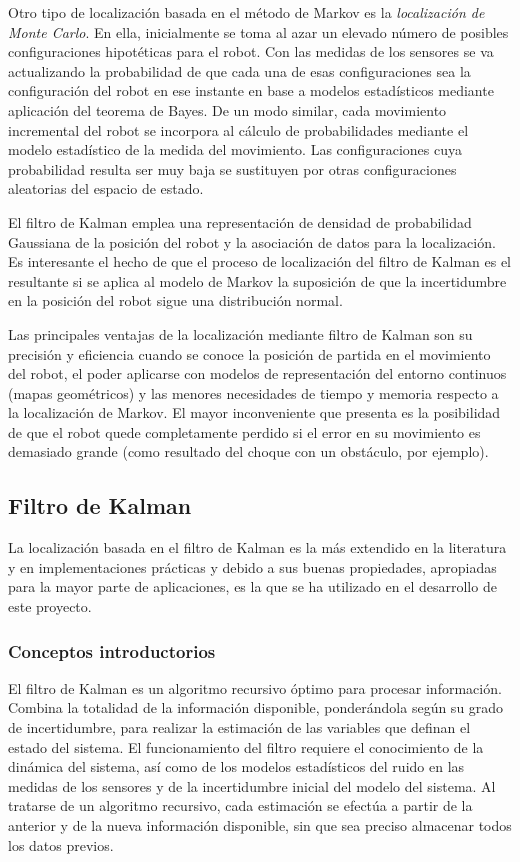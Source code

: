 Otro tipo de localización basada en el método de Markov es la \emph{ localización de Monte Carlo}. En ella, inicialmente se toma al azar  un elevado número de posibles configuraciones hipotéticas para el robot. Con las medidas de los sensores se va actualizando la probabilidad de que cada una de esas configuraciones sea la configuración del robot en ese instante en base a modelos estadísticos mediante aplicación del teorema de Bayes. De un modo similar, cada movimiento incremental del robot se incorpora al cálculo de probabilidades mediante el modelo estadístico de la medida del movimiento. Las configuraciones cuya probabilidad resulta ser muy baja se sustituyen por otras configuraciones aleatorias del espacio de estado.

El filtro de Kalman emplea una representación de densidad de probabilidad Gaussiana de la posición del robot y la asociación de datos para la localización. Es interesante el hecho de que el proceso de localización del filtro de Kalman es el resultante si se aplica al modelo de Markov la suposición de que la incertidumbre en la posición del robot sigue una distribución normal.

Las principales ventajas de la localización mediante filtro de Kalman son su precisión y eficiencia cuando se conoce la posición de partida en el movimiento del robot, el poder aplicarse con modelos de representación del entorno continuos (mapas geométricos) y las menores necesidades de tiempo y memoria respecto a la localización de Markov. El mayor inconveniente que presenta es la posibilidad de que el robot quede completamente perdido si el error en su movimiento es demasiado grande (como resultado del choque con un obstáculo, por ejemplo).

\subsection {Filtro de Kalman}
La localización basada en el filtro de Kalman es la más extendido en la literatura y en implementaciones prácticas y debido a sus buenas propiedades, apropiadas para la mayor parte de aplicaciones, es la que se ha utilizado en el desarrollo de este proyecto.

\subsubsection {Conceptos introductorios}
El filtro de Kalman es un algoritmo recursivo óptimo para procesar información\cite{Maybeck79}. Combina la totalidad de la información disponible, ponderándola según su grado de incertidumbre, para realizar la estimación de las variables que definan el estado del sistema. El funcionamiento del filtro requiere el conocimiento de la dinámica del sistema, así como de los modelos estadísticos del ruido en las medidas de los sensores y de la incertidumbre inicial del modelo del sistema. Al tratarse de un algoritmo recursivo, cada estimación se efectúa a partir de la anterior y de la nueva información disponible, sin que sea preciso almacenar todos los datos previos.


